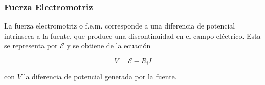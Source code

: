 \subsubsection{Fuerza Electromotriz}

La fuerza electromotriz o f.e.m. corresponde a una diferencia de potencial intrínseca a la fuente, que produce una discontinuidad en el campo eléctrico. Esta se representa por $\mathcal{E}$ y se obtiene de la ecuación

\[V = \mathcal{E}-R_iI\]

con $V$ la diferencia de potencial generada por la fuente.

\newpage